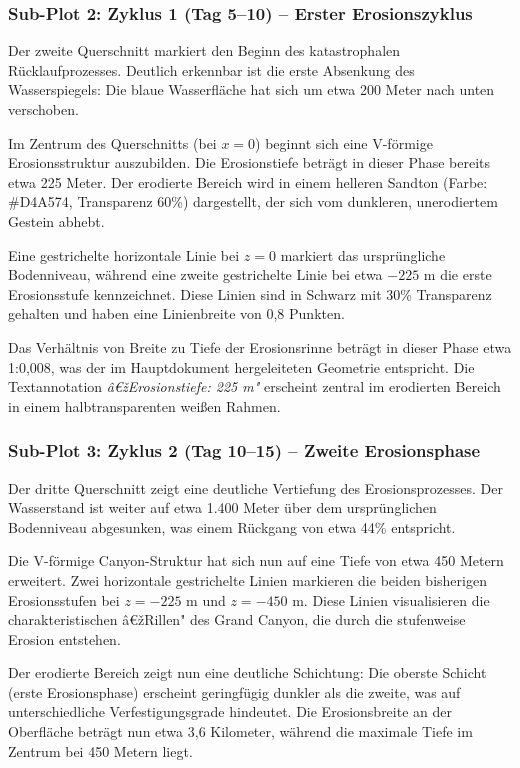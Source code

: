 \subsubsection*{Sub-Plot 2: Zyklus 1 (Tag 5--10) -- Erster Erosionszyklus}

Der zweite Querschnitt markiert den Beginn des katastrophalen Rücklaufprozesses. Deutlich erkennbar ist die erste Absenkung des Wasserspiegels: Die blaue Wasserfläche hat sich um etwa 200 Meter nach unten verschoben. 

Im Zentrum des Querschnitts (bei $x = 0$) beginnt sich eine V-förmige Erosionsstruktur auszubilden. Die Erosionstiefe beträgt in dieser Phase bereits etwa 225 Meter. Der erodierte Bereich wird in einem helleren Sandton (Farbe: \#D4A574, Transparenz 60\%) dargestellt, der sich vom dunkleren, unerodiertem Gestein abhebt.

Eine gestrichelte horizontale Linie bei $z = 0$ markiert das ursprüngliche Bodenniveau, während eine zweite gestrichelte Linie bei etwa $-225$ m die erste Erosionsstufe kennzeichnet. Diese Linien sind in Schwarz mit 30\% Transparenz gehalten und haben eine Linienbreite von 0,8 Punkten.

Das Verhältnis von Breite zu Tiefe der Erosionsrinne beträgt in dieser Phase etwa 1:0,008, was der im Hauptdokument hergeleiteten Geometrie entspricht. Die Textannotation \textit{â€žErosionstiefe: 225 m"} erscheint zentral im erodierten Bereich in einem halbtransparenten weißen Rahmen.

\subsubsection*{Sub-Plot 3: Zyklus 2 (Tag 10--15) -- Zweite Erosionsphase}

Der dritte Querschnitt zeigt eine deutliche Vertiefung des Erosionsprozesses. Der Wasserstand ist weiter auf etwa 1.400 Meter über dem ursprünglichen Bodenniveau abgesunken, was einem Rückgang von etwa 44\% entspricht.

Die V-förmige Canyon-Struktur hat sich nun auf eine Tiefe von etwa 450 Metern erweitert. Zwei horizontale gestrichelte Linien markieren die beiden bisherigen Erosionsstufen bei $z = -225$ m und $z = -450$ m. Diese Linien visualisieren die charakteristischen â€žRillen" des Grand Canyon, die durch die stufenweise Erosion entstehen.

Der erodierte Bereich zeigt nun eine deutliche Schichtung: Die oberste Schicht (erste Erosionsphase) erscheint geringfügig dunkler als die zweite, was auf unterschiedliche Verfestigungsgrade hindeutet. Die Erosionsbreite an der Oberfläche beträgt nun etwa 3,6 Kilometer, während die maximale Tiefe im Zentrum bei 450 Metern liegt.

